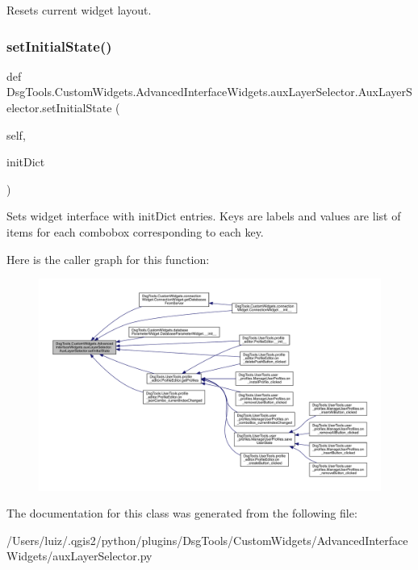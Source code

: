 \begin{DoxyVerb}Resets current widget layout.
\end{DoxyVerb}
 \mbox{\label{class_dsg_tools_1_1_custom_widgets_1_1_advanced_interface_widgets_1_1aux_layer_selector_1_1_aux_layer_selector_a66fe0ef6853f16d0baba8d6b3a0b7ff6}} 
\subsubsection{\texorpdfstring{set\+Initial\+State()}{setInitialState()}}
{\footnotesize\ttfamily def Dsg\+Tools.\+Custom\+Widgets.\+Advanced\+Interface\+Widgets.\+aux\+Layer\+Selector.\+Aux\+Layer\+Selector.\+set\+Initial\+State (\begin{DoxyParamCaption}\item[{}]{self,  }\item[{}]{init\+Dict }\end{DoxyParamCaption})}

\begin{DoxyVerb}Sets widget interface with initDict entries. Keys are labels and values are list of items for each combobox corresponding to each key.
\end{DoxyVerb}
 Here is the caller graph for this function\+:
\nopagebreak
\begin{figure}[H]
\begin{center}
\leavevmode
\includegraphics[width=350pt]{class_dsg_tools_1_1_custom_widgets_1_1_advanced_interface_widgets_1_1aux_layer_selector_1_1_aux_layer_selector_a66fe0ef6853f16d0baba8d6b3a0b7ff6_icgraph}
\end{center}
\end{figure}


The documentation for this class was generated from the following file\+:\begin{DoxyCompactItemize}
\item 
/\+Users/luiz/.\+qgis2/python/plugins/\+Dsg\+Tools/\+Custom\+Widgets/\+Advanced\+Interface\+Widgets/aux\+Layer\+Selector.\+py\end{DoxyCompactItemize}
